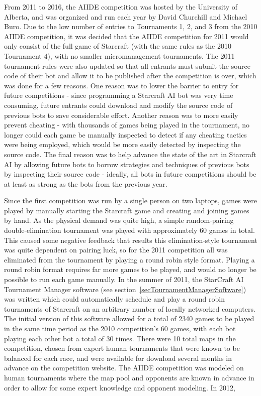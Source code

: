 From 2011 to 2016, the AIIDE competition was hosted by the University of Alberta, and was organized and run each year by David Churchill and Michael Buro. Due to the low number of entries to Tournaments 1, 2, and 3 from the 2010 AIIDE competition, it was decided that the AIIDE competition for 2011 would only consist of the full game of Starcraft (with the same rules as the 2010 Tournament 4), with no smaller micromanagement tournaments. The 2011 tournament rules were also updated so that all entrants must submit the source code of their bot and allow it to be published after the competition is over, which was done for a few reasons. One reason was to lower the barrier to entry for future competitions - since programming a Starcraft AI bot was very time consuming, future entrants could download and modify the source code of previous bots to save considerable effort. Another reason was to more easily prevent cheating - with thousands of games being played in the tournament, no longer could each game be manually inspected to detect if any cheating tactics were being employed, which would be more easily detected by inspecting the source code. The final reason was to help advance the state of the art in Starcraft AI by allowing future bots to borrow strategies and techniques of previous bots by inspecting their source code - ideally, all bots in future competitions should be at least as strong as the bots from the previous year. 

Since the first competition was run by a single person on two laptops, games were played by manually starting the Starcraft game and creating and joining games by hand. As the physical demand was quite high, a simple random-pairing double-elimination tournament was played with approximately 60 games in total. This caused some negative feedback that results this elimination-style tournament was quite dependent on pairing luck, so for the 2011 competition all was eliminated from the tournament by playing a round robin style format. Playing a round robin format requires far more games to be played, and would no longer be possible to run each game manually. In the summer of 2011, the StarCraft AI Tournament Manager software (see section~\ref{secTournamentManagerSoftware}) was written which could automatically schedule and play a round robin tournaments of Starcraft on an arbitrary number of locally networked computers. The initial version of this software allowed for a total of 2340 games to be played in the same time period as the 2010 competition's 60 games, with each bot playing each other bot a total of 30 times. There were 10 total maps in the competition, chosen from expert human tournaments that were known to be balanced for each race, and were available for download several months in advance on the competition website. The AIIDE competition was modeled on human tournaments where the map pool and opponents are known in advance in order to allow for some expert knowledge and opponent modeling. In 2012, 


